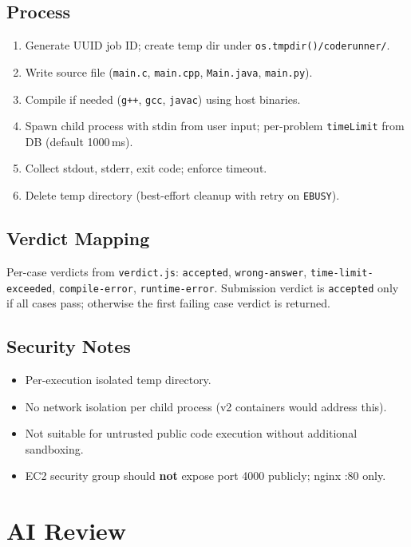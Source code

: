 \documentclass[11pt,a4paper]{article}
\begin{document}
\subsection{Process}
\begin{enumerate}[noitemsep]
  \item Generate UUID job ID; create temp dir under \texttt{os.tmpdir()/coderunner/}.
  \item Write source file (\texttt{main.c}, \texttt{main.cpp}, \texttt{Main.java}, \texttt{main.py}).
  \item Compile if needed (\texttt{g++}, \texttt{gcc}, \texttt{javac}) using host binaries.
  \item Spawn child process with stdin from user input; per-problem \texttt{timeLimit} from DB (default 1000\,ms).
  \item Collect stdout, stderr, exit code; enforce timeout.
  \item Delete temp directory (best-effort cleanup with retry on \texttt{EBUSY}).
\end{enumerate}

\subsection{Verdict Mapping}
Per-case verdicts from \texttt{verdict.js}: \texttt{accepted}, \texttt{wrong-answer}, \texttt{time-limit-exceeded}, \texttt{compile-error}, \texttt{runtime-error}. Submission verdict is \texttt{accepted} only if all cases pass; otherwise the first failing case verdict is returned.

\subsection{Security Notes}
\begin{itemize}[noitemsep]
  \item Per-execution isolated temp directory.
  \item No network isolation per child process (v2 containers would address this).
  \item Not suitable for untrusted public code execution without additional sandboxing.
  \item EC2 security group should \textbf{not} expose port 4000 publicly; nginx :80 only.
\end{itemize}

\section{AI Review}
\end{document}
